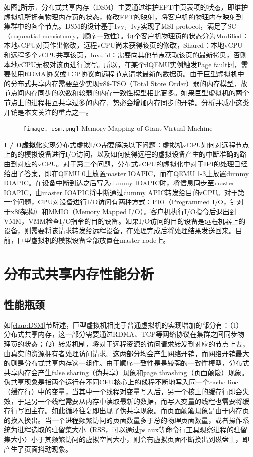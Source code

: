 如图\ref{fig:DSM}所示，分布式共享内存（DSM）主要通过维护EPT中页表项的状态，即维护虚拟机所拥有物理内存页的状态，修改EPT的映射，将客户机的物理内存映射到集群中的各个节点。DSM的设计基于Ivy\cite{ivy}，Ivy实现了MSI protocol，满足了SC（sequential consistency，顺序一致性）。每个客户机物理页的状态分为Modified：本地vCPU对页作出修改，远程vCPU尚未获得该页的修改，Shared：本地vCPU和远程多个vCPU共享该页，Invalid：需要向其他节点获取该页的最新拷贝，否则本地vCPU无权对该页进行读写。所以，在某个dQEMU实例触发Page fault时，需要使用RDMA协议或TCP协议向远程节点请求最新的数据页。由于巨型虚拟机中的分布式共享内存需要至少实现x86-TSO（Total Store Order）\cite{tso}弱的内存模型，故节点间内存同步的次数和较弱的内存一致性模型相比更多。如果巨型虚拟机的两个节点上的进程相互共享过多的内存，势必会增加内存同步的开销。分析并减小这类开销是本文关注的重点之一。
\label{chap:DSM}
\begin{figure}[!htp]
  \centering
  \texttt{[image: dsm.png]}
    {Memory Mapping of Giant Virtual Machine}
  \label{fig:DSM}
\end{figure}

\noindent\textbf{I / O虚拟化}\quad 实现分布式虚拟I/O需要解决以下问题：虚拟机vCPU如何对远程节点上的的模拟设备进行I/O访问，以及如何使得远程的虚拟设备产生的中断准确的路由到对应的vCPU。对于第二个问题，分布式vCPU的虚拟化中对于IPI的处理已经给出了答案，即在QEMU 0上放置master IOAPIC，而在QEMU 1-3上放置dummy IOAPIC。在设备中断到达之后写入dummy IOAPIC时，将信息同步至master IOAPIC，由master IOAPIC将中断通过dummy APIC转发给目的vCPU。对于第一个问题，CPU对设备进行I/O访问有两种方式：PIO（Programmed I/O，针对于x86架构）和MMIO（Memory Mapped I/O）。客户机执行I/O指令后退出到VMM，VMM检查I/O指令的目的设备。如果I/O访问的目的设备是远程机器上的设备，则需要将该请求转发给远程设备，在处理完成后将处理结果发送回来。目前，巨型虚拟机的模拟设备全部放置在master node上。

\section{分布式共享内存性能分析}
\subsection{性能瓶颈}
\label{chap:bottle}
如\ref{chap:DSM}节所述，巨型虚拟机相比于普通虚拟机的实现增加的部分有：（1）分布式共享内存，这一部分需要通过RDMA、TCP等网络协议在集群之间同步物理页的状态；（2）转发机制，将对于远程资源的访问请求转发到对应的节点上去，由真实的资源拥有者处理访问请求。这两部分均会产生网络开销，而网络开销最大的则是分布式共享内存这一组件。由于顺序一致性是是较强的一致性模型，分布式共享内存会产生false sharing（伪共享）现象和page thrashing（页面颠簸）现象\cite{sharing}。伪共享现象是指两个运行在不同CPU核心上的线程不断地写入同一个cache line（缓存行）中的变量，当其中一个线程对变量写入后，另一个核上的缓存行即会失效，于是另一个线程需要从内存中读取最新的数据，而写入变量的线程也需要将缓存行写回主存。如此循环往复即出现了伪共享现象。而页面颠簸现象是由于内存页的换入换出。当一个进程频繁访问的页面数量多于总的物理页面数量，或者操作系统为进程选取的驻留集大小（RSS，可以通过ps aux等命令行工具观察进程的驻留集大小）小于其频繁访问的虚拟空间大小，则会有虚拟页面不断换出到磁盘上，即产生了页面抖动现象。


